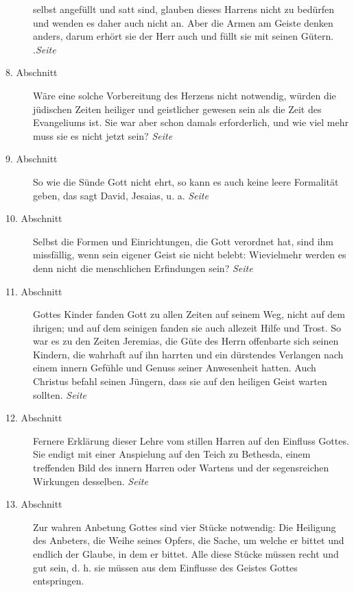 \begin{description}
selbst angefüllt und satt sind, glauben dieses Harrens nicht zu bedürfen und
wenden es daher auch nicht an. Aber die Armen am Geiste denken anders, darum
erhört sie der Herr auch und füllt sie mit seinen Gütern.\\
.\dotfill \textit{Seite~\pageref{kap6_ab7}}\\
\item[8. Abschnitt] Wäre eine solche
Vorbereitung des Herzens nicht notwendig, würden die jüdischen Zeiten heiliger
und geistlicher gewesen sein als die Zeit des Evangeliums ist. Sie war aber
schon damals erforderlich, und wie viel mehr muss sie es nicht jetzt sein?
\dotfill \textit{Seite~\pageref{kap6_ab8}}\\
\item[9. Abschnitt] So wie die Sünde Gott nicht ehrt, so kann es auch keine
leere Formalität geben, das sagt David, Jesaias, u. a.
\dotfill \textit{Seite~\pageref{kap6_ab9}}\\
\item[10. Abschnitt] Selbst die Formen und Einrichtungen, die Gott verordnet
hat, sind ihm missfällig, wenn sein eigener Geist sie nicht belebt: Wievielmehr
werden es denn nicht die menschlichen Erfindungen sein?
\dotfill \textit{Seite~\pageref{kap6_ab10}}\\
\item[11. Abschnitt] Gottes Kinder fanden Gott zu allen Zeiten auf seinem Weg,
nicht auf dem ihrigen; und auf dem seinigen fanden sie auch allezeit Hilfe und
Trost. So war es zu den Zeiten Jeremias, die Güte des Herrn offenbarte sich
seinen Kindern, die wahrhaft auf ihn harrten und ein dürstendes Verlangen nach
einem innern Gefühle und Genuss seiner Anwesenheit hatten. Auch Christus befahl
seinen Jüngern, dass sie auf den heiligen Geist warten sollten.
\dotfill \textit{Seite~\pageref{kap6_ab11}}\\
\item[12. Abschnitt] Fernere Erklärung dieser Lehre vom stillen Harren auf den
Einfluss Gottes. Sie endigt mit einer Anspielung auf den Teich zu Bethesda,
einem treffenden Bild des innern Harren oder Wartens und der segensreichen
Wirkungen desselben.
\dotfill \textit{Seite~\pageref{kap6_ab12}}\\
\item[13. Abschnitt] Zur wahren Anbetung Gottes sind vier Stücke notwendig: Die
Heiligung des Anbeters, die Weihe seines Opfers, die Sache, um welche er bittet
und endlich der Glaube, in dem er bittet. Alle diese Stücke müssen recht und gut
sein, d. h. sie müssen aus dem Einflusse des Geistes Gottes entspringen.

\end{description}
